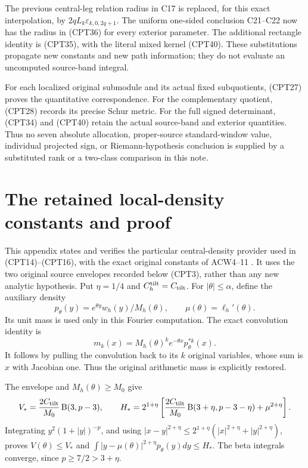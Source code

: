 \documentclass[11pt]{article}
\begin{document}
The previous central-leg relation radius in C17 is replaced,
for this exact interpolation, by \(2qL_k\varepsilon_{k,0,2q+1}\).
The uniform one-sided conclusion C21--C22 now has the radius
in (CPT36) for every exterior parameter.
The additional rectangle identity is (CPT35), with the
literal mixed kernel (CPT40).  These substitutions propagate
new constants and new path information; they do not evaluate
an uncomputed source-band integral.

For each localized original submodule and its actual fixed
subquotients, (CPT27) proves the quantitative correspondence.
For the complementary quotient, (CPT28) records its precise
Schur metric.  For the full signed determinant, (CPT34) and
(CPT40) retain the actual source-band and exterior quantities.
Thus no seven absolute allocation, proper-source
standard-window value, individual projected sign, or
Riemann-hypothesis conclusion is supplied by a substituted
rank or a two-class comparison in this note.

\appendix
\section{The retained local-density constants and proof}

This appendix states and verifies the particular central-density
provider used in (CPT14)--(CPT16), with the exact original constants
of ACW4--11 \cite{centralProvider}.  It uses the two original
source envelopes recorded below (CPT3), rather than any new
analytic hypothesis.
Put \(\eta=1/4\) and \(C_h^{\rm tilt}=C_{\rm tilt}\).
For \(|\theta|\le\alpha\), define the auxiliary density
\[
 p_\theta(y)=e^{\theta y}w_h(y)/M_h(\theta),\qquad
 \mu(\theta)=\ell_h'(\theta).
\]
Its unit mass is used only in this Fourier computation.  The
exact convolution identity is
\begin{equation}\tag{CPT41}
 m_k(x)=M_h(\theta)^k e^{-\theta x}p_\theta^{*k}(x).
\end{equation}
It follows by pulling the convolution back to its \(k\)
original variables, whose sum is \(x\) with Jacobian one.
Thus the original arithmetic mass is explicitly restored.

The envelope and \(M_h(\theta)\ge M_0\) give
\[
 V_*=\frac{2C_{\rm tilt}}{M_0}\operatorname B(3,p-3),
 \qquad
 H_*=
 2^{1+\eta}\left[
 \frac{2C_{\rm tilt}}{M_0}\operatorname B(3+\eta,p-3-\eta)
                      +\mu^{2+\eta}\right].
\]
Integrating \(y^2(1+|y|)^{-p}\), and using
\(|x-y|^{2+\eta}\le2^{1+\eta}(|x|^{2+\eta}+|y|^{2+\eta})\),
proves \(V(\theta)\le V_*\) and
\(\int|y-\mu(\theta)|^{2+\eta}p_\theta(y)dy\le H_*\).
The beta integrals converge, since \(p\ge7/2>3+\eta\).
\end{document}

